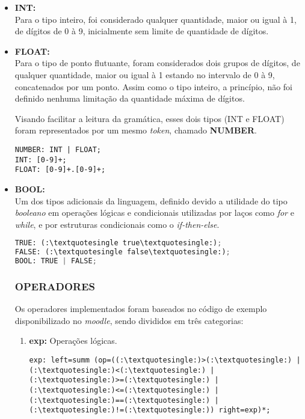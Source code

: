             \begin{itemize}
                \item \textbf{INT:}\\
                    Para o tipo inteiro, foi considerado qualquer quantidade, maior ou igual à 1, de dígitos de 0 à 9, inicialmente sem limite de quantidade de dígitos.

                \item \textbf{FLOAT:}\\
                    Para o tipo de ponto flutuante, foram considerados dois grupos de dígitos, de qualquer quantidade, maior ou igual à 1 estando no intervalo de 0 à 9, concatenados por um ponto. Assim como o tipo inteiro, a princípio, não foi definido nenhuma limitação da quantidade máxima de dígitos.

                    Visando facilitar a leitura da gramática, esses dois tipos (INT e FLOAT) foram representados por um mesmo \textit{token}, chamado \textbf{NUMBER}.

                    \begin{lstlisting}
NUMBER: INT | FLOAT;
INT: [0-9]+;
FLOAT: [0-9]+.[0-9]+;
                    \end{lstlisting}
              \item \textbf{BOOL:}\\
                    Um dos tipos adicionais da linguagem, definido devido a utilidade do tipo \textit{booleano} em operações lógicas e condicionais utilizadas por laços como \textit{for} e \textit{while}, e por estruturas condicionais como o \textit{if-then-else}.

                    \begin{lstlisting}[language=python]
TRUE: (:\textquotesingle true\textquotesingle:);
FALSE: (:\textquotesingle false\textquotesingle:);
BOOL: TRUE | FALSE;
                    \end{lstlisting}
              
                    
        \subsubsection{\normalsize OPERADORES}
            Os operadores implementados foram baseados no código de exemplo disponibilizado no \textit{moodle}, sendo divididos em três categorias:
            \begin{enumerate}
                \item \textbf{exp:} Operações lógicas.
                    \begin{lstlisting}
exp: left=summ (op=((:\textquotesingle:)>(:\textquotesingle:) | (:\textquotesingle:)<(:\textquotesingle:) | (:\textquotesingle:)>=(:\textquotesingle:) | (:\textquotesingle:)<=(:\textquotesingle:) | (:\textquotesingle:)==(:\textquotesingle:) | (:\textquotesingle:)!=(:\textquotesingle:)) right=exp)*;
                    \end{lstlisting}


\end{enumerate}
\end{itemize}
